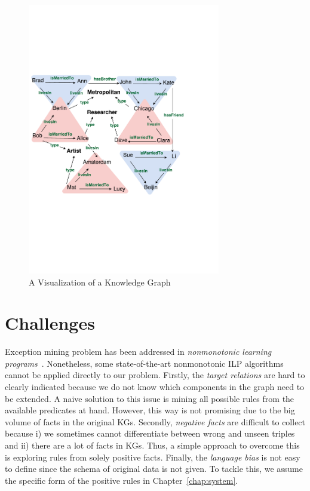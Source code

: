 \begin{figure}[t]
\centering
\includegraphics[width=0.75\textwidth]{figures/kg_advanced_col}
\caption{A Visualization of a Knowledge Graph}
\label{fig1.1}
\end{figure}

\section{Challenges}

Exception mining problem has been addressed in \textit{nonmonotonic learning programs}~\cite{ref11, ref40, ref41, ref32, ref42}. Nonetheless, some state-of-the-art nonmonotonic ILP algorithms cannot be applied directly to our problem. Firstly, the \textit{target relations} are hard to clearly indicated because we do not know which components in the graph need to be extended. A naive solution to this issue is mining all possible rules from the available predicates at hand. However, this way is not promising due to the big volume of facts in the original KGs. Secondly, \textit{negative facts} are difficult to collect because i) we sometimes cannot differentiate between wrong and unseen triples and ii) there are a lot of facts in KGs. Thus, a simple approach to overcome this is exploring rules from solely positive facts. Finally,  the \textit{language bias} is not easy to define since the schema of original data is not given. To tackle this, we assume the specific form of the positive rules in Chapter~\ref{chap:system}.

